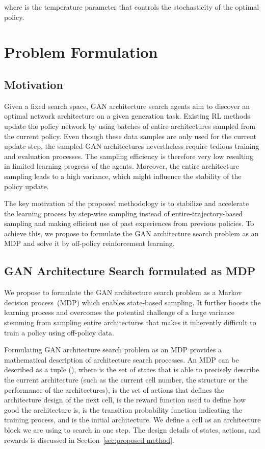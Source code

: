 \documentclass[runningheads]{llncs}
\begin{document}
\noindent where  is the temperature parameter that controls the stochasticity of the optimal policy.



\section{Problem Formulation}

\subsection{Motivation}
Given a fixed search space, GAN architecture search agents aim to discover an optimal network architecture on a given generation task. Existing RL methods update the policy network by using batches of entire architectures sampled from the current policy. Even though these data samples are only used for the current update step, the sampled GAN architectures nevertheless require  tedious training and evaluation processes. The sampling efficiency is therefore very low resulting in limited learning progress of the agents. Moreover, the entire architecture sampling leads to a high variance, which might influence the stability of the policy update.


The key motivation of the proposed methodology is to stabilize and accelerate the learning process by step-wise sampling instead of entire-trajectory-based sampling and making efficient use of past experiences from previous policies. To achieve this, we propose to formulate the GAN architecture search problem as an MDP and solve it by off-policy reinforcement learning. 

\subsection{GAN Architecture Search formulated as MDP}
We propose to formulate the GAN architecture search problem as a  Markov decision process~(MDP) which enables state-based sampling. It further boosts the learning process and overcomes the potential challenge of a large variance stemming from sampling entire architectures  that makes it inherently difficult to train a policy using off-policy data. 

Formulating GAN architecture search problem as an MDP provides a mathematical description of architecture search processes. An MDP can be described as a tuple (), where  is the set of states that is able to precisely describe the current architecture  (such as the current cell number, the structure or the performance of the architectures),  is the set of actions that defines the architecture design of the next cell,  is the reward function used to define how good the architecture is,  is the transition probability function indicating the training process, and   is the initial architecture. We define a cell as an architecture block we are using to search in one step.  The design details of states, actions, and rewards is discussed in Section~\ref{sec:proposed method}. 
\end{document}
